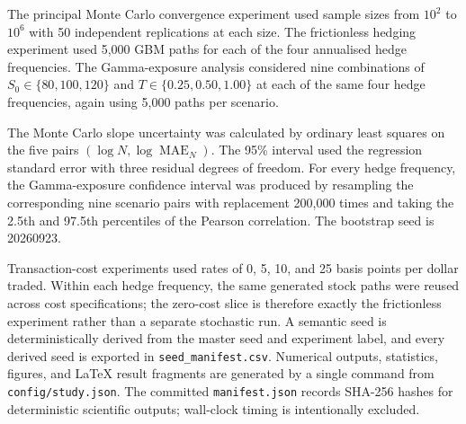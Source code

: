 \documentclass[11pt,a4paper]{article}
\begin{document}
The principal Monte Carlo convergence experiment used sample sizes from $10^2$ to $10^6$ with 50 independent replications at each size. The frictionless hedging experiment used 5,000 GBM paths for each of the four annualised hedge frequencies. The Gamma-exposure analysis considered nine combinations of $S_0\in\{80,100,120\}$ and $T\in\{0.25,0.50,1.00\}$ at each of the same four hedge frequencies, again using 5,000 paths per scenario.

The Monte Carlo slope uncertainty was calculated by ordinary least squares on the five pairs $(\log N,\log\operatorname{MAE}_N)$. The 95\% interval used the regression standard error with three residual degrees of freedom. For every hedge frequency, the Gamma-exposure confidence interval was produced by resampling the corresponding nine scenario pairs with replacement 200,000 times and taking the 2.5th and 97.5th percentiles of the Pearson correlation. The bootstrap seed is 20260923.

Transaction-cost experiments used rates of 0, 5, 10, and 25 basis points per dollar traded. Within each hedge frequency, the same generated stock paths were reused across cost specifications; the zero-cost slice is therefore exactly the frictionless experiment rather than a separate stochastic run. A semantic seed is deterministically derived from the master seed and experiment label, and every derived seed is exported in \texttt{seed\_manifest.csv}. Numerical outputs, statistics, figures, and LaTeX result fragments are generated by a single command from \texttt{config/study.json}. The committed \texttt{manifest.json} records SHA-256 hashes for deterministic scientific outputs; wall-clock timing is intentionally excluded.
\end{document}
